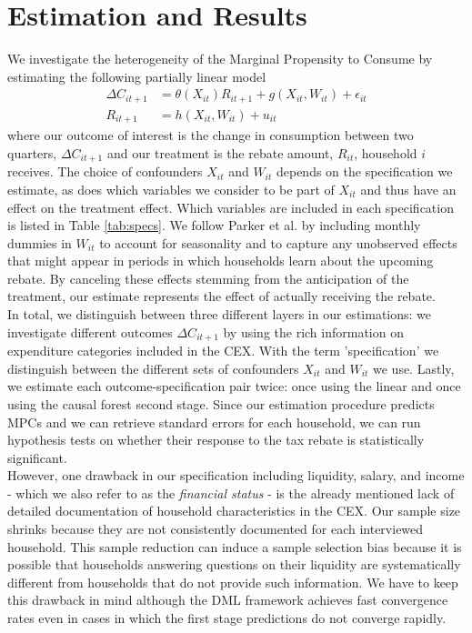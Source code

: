 \section{Estimation and Results} \label{sec:estim_res}
We investigate the heterogeneity of the Marginal Propensity to Consume by estimating the following partially linear model
\begin{align}
    \Delta C_{it+1}&=\theta(X_{it})R_{it+1}+g(X_{it}, W_{it})+\epsilon_{it} \label{eq:plm_C1}\\
    R_{it+1}&=h(X_{it}, W_{it})+u_{it} \label{eq:plm_C2}
\end{align}
where our outcome of interest is the change in consumption between two quarters, $\Delta C_{it+1}$ and our treatment is the rebate amount, $R_{it}$, household $i$ receives. The choice of confounders $X_{it}$ and $W_{it}$ depends on the specification we estimate, as does which variables we consider to be part of $X_{it}$ and thus have an effect on the treatment effect. Which variables are included in each specification is listed in Table \ref{tab:specs}. We follow Parker et al. by including monthly dummies in $W_{it}$ to account for seasonality and to capture any unobserved effects that might appear in periods in which households learn about the upcoming rebate. By canceling these effects stemming from the anticipation of the treatment, our estimate represents the effect of actually receiving the rebate. \\ 
In total, we distinguish between three different layers in our estimations: we investigate different outcomes $\Delta C_{it+1}$ by using the rich information on expenditure categories included in the CEX. With the term 'specification' we distinguish between the different sets of confounders $X_{it}$ and $W_{it}$ we use. Lastly, we estimate each outcome-specification pair twice: once using the linear and once using the causal forest second stage. Since our estimation procedure predicts MPCs and we can retrieve standard errors for each household, we can run hypothesis tests on whether their response to the tax rebate is statistically significant. \\

However, one drawback in our specification including liquidity, salary, and income - which we also refer to as the \textit{financial status} - is the already mentioned lack of detailed documentation of household characteristics in the CEX. Our sample size shrinks because they are not consistently documented for each interviewed household. This sample reduction can induce a sample selection bias because it is possible that households answering questions on their liquidity are systematically different from households that do not provide such information. We have to keep this drawback in mind although the DML framework achieves fast convergence rates even in cases in which the first stage predictions do not converge rapidly.

